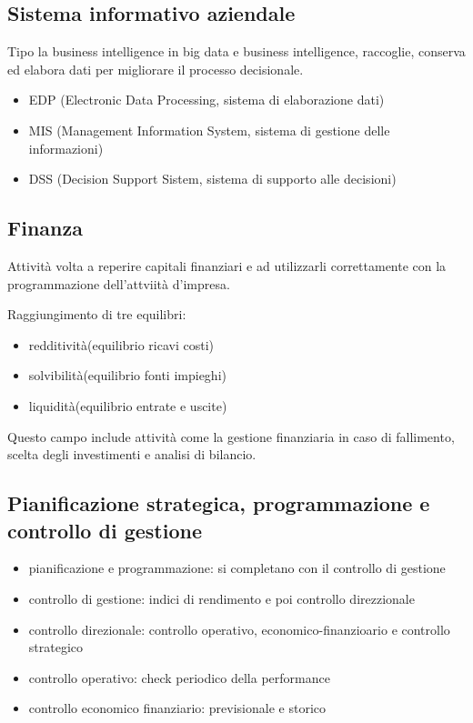 \subsection{Sistema informativo aziendale}

Tipo la business intelligence in big data e business intelligence, raccoglie, conserva ed elabora dati per migliorare il processo decisionale.


\begin{itemize}
    \item EDP (Electronic Data Processing, sistema di
    elaborazione dati)

    \item MIS (Management Information System, sistema di
    gestione delle informazioni)

    \item DSS (Decision Support Sistem, sistema di supporto alle
    decisioni)
\end{itemize}


\subsection{Finanza}

Attività volta a reperire capitali finanziari e ad utilizzarli correttamente con la programmazione dell'attviità d'impresa.

Raggiungimento di tre equilibri:
\begin{itemize}
    \item redditività(equilibrio ricavi costi)
    \item solvibilità(equilibrio fonti impieghi)
    \item liquidità(equilibrio entrate e uscite)
\end{itemize}


Questo campo include attività come la gestione finanziaria in caso di fallimento, scelta degli investimenti e analisi di bilancio.


\subsection{Pianificazione strategica, programmazione e controllo di gestione}
\begin{itemize}
    \item pianificazione e programmazione: si completano con il controllo di gestione
    \item controllo di gestione: indici di rendimento e poi controllo direzzionale
    \item controllo direzionale: controllo operativo, economico-finanzioario e controllo strategico
    \item controllo operativo: check periodico della performance
    \item controllo economico finanziario: previsionale e storico
\end{itemize}

